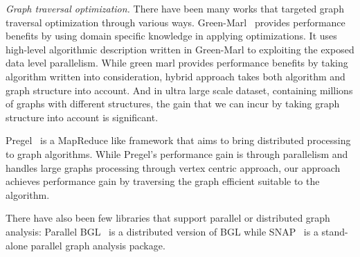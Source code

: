 \emph{Graph traversal optimization.}%
There have been many works that targeted graph traversal optimization through 
various ways. Green-Marl~\cite{hong2012green} provides performance benefits 
by using domain specific knowledge in applying optimizations. It uses high-level 
algorithmic description written in Green-Marl to exploiting the exposed 
data level parallelism. While green marl provides performance benefits by 
taking algorithm written into consideration, hybrid approach takes both 
algorithm and graph structure into account. And in ultra large scale dataset, 
containing millions of graphs with different structures, the gain that we can 
incur by taking graph structure into account is significant.

Pregel~\cite{malewicz2010pregel} is a MapReduce like framework that aims to 
bring distributed processing to graph algorithms. While Pregel's performance 
gain is through parallelism and handles large graphs processing through 
vertex centric approach, our approach achieves performance gain by traversing 
the graph efficient suitable to the algorithm.

There have also been few libraries that support parallel or distributed graph 
analysis: Parallel BGL~\cite{gregor2005parallel}  is a distributed version of 
BGL while SNAP~\cite{bader2008snap}  is a stand-alone parallel graph analysis 
package.
